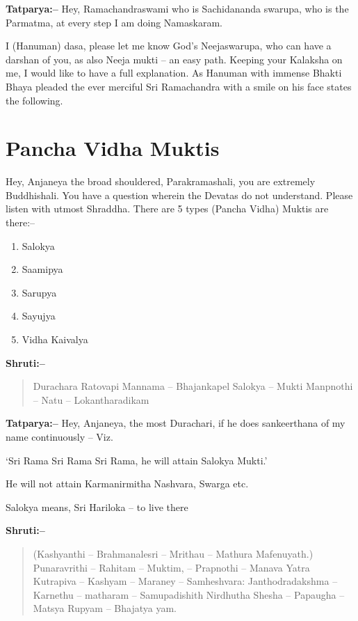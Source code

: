\textbf{Tatparya:–} Hey, Ramachandraswami who is Sachidananda swarupa, who is the Parmatma, at every step I am doing Namaskaram.

I (Hanuman) dasa, please let me know God's Neejaswarupa, who can have a darshan of you, as also Neeja mukti – an easy path. Keeping your Kalaksha on me, I would like to have a full explanation. As Hanuman with immense Bhakti Bhaya pleaded the ever merciful Sri Ramachandra with a smile on his face states the following.

\chapter{Pancha Vidha Muktis}

Hey, Anjaneya the broad shouldered, Parakramashali, you are extremely Buddhishali. You have a question wherein the Devatas do not understand. Please listen with utmost Shraddha. There are 5 types (Pancha Vidha) Muktis are there:–

\begin{enumerate}
\item Salokya

 \item Saamipya

 \item Sarupya

 \item Sayujya

 \item Vidha Kaivalya

\end{enumerate}

\textbf{Shruti:–}

\begin{verse}
Durachara Ratovapi Mannama – Bhajankapel Salokya – Mukti Manpnothi – Natu – Lokantharadikam 
\end{verse}

\textbf{Tatparya:–} Hey, Anjaneya, the most Durachari, if he does sankeerthana of my name continuously – Viz.

‘Sri Rama Sri Rama Sri Rama, he will attain Salokya Mukti.’

He will not attain Karmanirmitha Nashvara, Swarga etc.

Salokya means, Sri Hariloka – to live there

\textbf{Shruti:–}

\begin{verse}
(Kashyanthi – Brahmanalesri – Mrithau – Mathura Mafenuyath.) Punaravrithi – Rahitam – Muktim, – Prapnothi – Manava  Yatra Kutrapiva – Kashyam – Maraney – Samheshvara:  Janthodradakshma – Karnethu – matharam – Samupadishith Nirdhutha Shesha – Papaugha – Matsya Rupyam – Bhajatya yam.
\end{verse}

